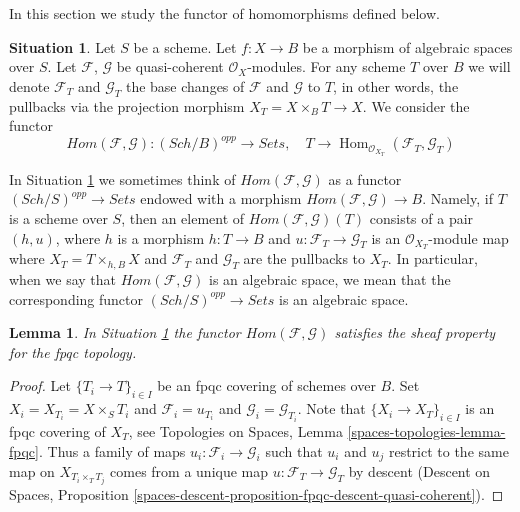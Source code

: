 \documentclass{stacks-project}
\theoremstyle{plain}
\newtheorem{lemma}[subsection]{Lemma}
\theoremstyle{definition}
\newtheorem{situation}[subsection]{Situation}
\theoremstyle{remark}
\numberwithin{equation}{subsection}
\def\Hom{\mathop{\mathrm{Hom}}\nolimits}
\def\Sch{\mathit{Sch}}
\begin{document}
\noindent
In this section we study the functor of homomorphisms defined below.

\begin{situation}
\label{situation-hom}
Let $S$ be a scheme. Let $f : X \to B$ be a morphism of algebraic spaces
over $S$. Let $\mathcal{F}$, $\mathcal{G}$ be quasi-coherent
$\mathcal{O}_X$-modules. For any scheme $T$ over $B$ we will denote
$\mathcal{F}_T$ and $\mathcal{G}_T$ the base changes of
$\mathcal{F}$ and $\mathcal{G}$ to $T$, in other words, the pullbacks
via the projection morphism $X_T = X \times_B T \to X$.
We consider the functor
\begin{equation}
\label{equation-hom}
\mathit{Hom}(\mathcal{F}, \mathcal{G}) :
(\Sch/B)^{opp}
\longrightarrow
\textit{Sets},\quad
T
\longrightarrow
\Hom_{\mathcal{O}_{X_T}}(\mathcal{F}_T, \mathcal{G}_T)
\end{equation}
\end{situation}

\noindent
In Situation \ref{situation-hom} we sometimes think of
$\mathit{Hom}(\mathcal{F}, \mathcal{G})$ as a functor
$(\Sch/S)^{opp} \to \textit{Sets}$
endowed with a morphism
$\mathit{Hom}(\mathcal{F}, \mathcal{G}) \to B$.
Namely, if $T$ is a scheme over $S$, then an element of
$\mathit{Hom}(\mathcal{F}, \mathcal{G})(T)$ consists of a pair
$(h, u)$, where $h$ is a morphism $h : T \to B$ and
$u : \mathcal{F}_T \to \mathcal{G}_T$ is an $\mathcal{O}_{X_T}$-module
map where $X_T = T \times_{h, B} X$ and $\mathcal{F}_T$ and $\mathcal{G}_T$
are the pullbacks to $X_T$. In particular, when we say
that $\mathit{Hom}(\mathcal{F}, \mathcal{G})$ is an algebraic space,
we mean that the corresponding functor
$(\Sch/S)^{opp} \to \textit{Sets}$ is an algebraic space.

\begin{lemma}
\label{lemma-hom-sheaf}
In Situation \ref{situation-hom} the functor
$\mathit{Hom}(\mathcal{F}, \mathcal{G})$ 
satisfies the sheaf property for the fpqc topology.
\end{lemma}

\begin{proof}
Let $\{T_i \to T\}_{i \in I}$ be an fpqc covering of schemes over $B$.
Set $X_i = X_{T_i} = X \times_S T_i$ and $\mathcal{F}_i = u_{T_i}$
and $\mathcal{G}_i = \mathcal{G}_{T_i}$.
Note that $\{X_i \to X_T\}_{i \in I}$ is an fpqc covering of $X_T$, see
Topologies on Spaces, Lemma \ref{spaces-topologies-lemma-fpqc}.
Thus a family of maps $u_i : \mathcal{F}_i \to \mathcal{G}_i$
such that $u_i$ and $u_j$ restrict to the same map on
$X_{T_i \times_T T_j}$ comes from a unique map
$u : \mathcal{F}_T \to \mathcal{G}_T$ by descent
(Descent on Spaces, Proposition
\ref{spaces-descent-proposition-fpqc-descent-quasi-coherent}).
\end{proof}
\end{document}
